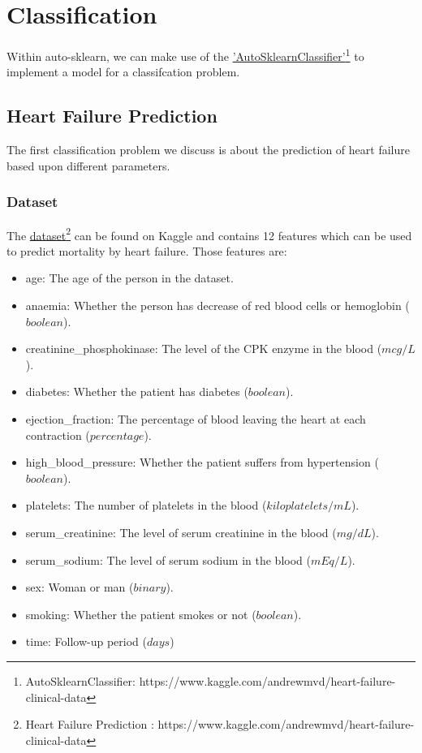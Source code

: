 \chapter{Classification}
\newcommand{\linkAutoSklearnClassifier}{https://www.kaggle.com/andrewmvd/heart-failure-clinical-data}

Within auto-sklearn, we can make use of the \href{\linkAutoSklearnClassifier}{'AutoSklearnClassifier'\footnote{AutoSklearnClassifier: \href{\linkAutoSklearnClassifier}{\linkAutoSklearnClassifier}}} to implement a model for a classifcation problem.

\section{Heart Failure Prediction}

The first classification problem we discuss is about the prediction of heart failure based upon different parameters.

\subsection{Dataset}
\newcommand{\kagglelinkheartfailure}{https://www.kaggle.com/andrewmvd/heart-failure-clinical-data}

The \href{\kagglelinkheartfailure}{dataset\footnote{Heart Failure Prediction : \href{\kagglelinkheartfailure}{\kagglelinkheartfailure}}} can be found on Kaggle and contains 12 features which can be used to predict mortality by heart failure. Those features are:

\begin{itemize}
  \item age: The age of the person in the dataset.
  \item anaemia: Whether the person has decrease of red blood cells or hemoglobin ($boolean$).
  \item creatinine\_phosphokinase: The level of the CPK enzyme in the blood ($mcg/L$).
  \item diabetes: Whether the patient has diabetes ($boolean$).
  \item ejection\_fraction: The percentage of blood leaving the heart at each contraction ($percentage$).
  \item high\_blood\_pressure: Whether the patient suffers from hypertension ($boolean$).
  \item platelets: The number of platelets in the blood ($kiloplatelets/mL$).
  \item serum\_creatinine: The level of serum creatinine in the blood ($mg/dL$).
  \item serum\_sodium: The level of serum sodium in the blood ($mEq/L$).
  \item sex: Woman or man ($binary$).
  \item smoking: Whether the patient smokes or not ($boolean$).
  \item time: Follow-up period ($days$)
\end{itemize}

